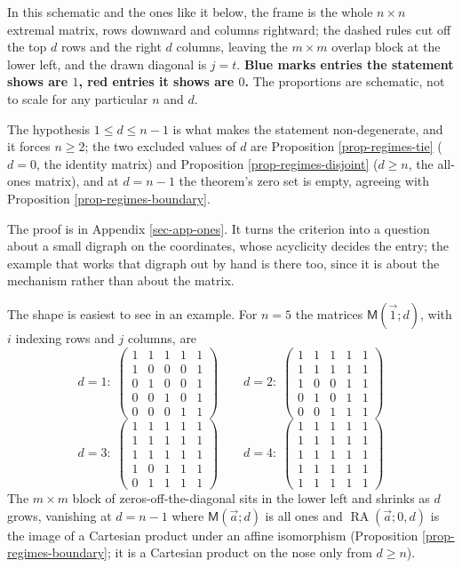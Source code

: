 \documentclass[11pt, a4paper, abstract=yes]{scrartcl}
\theoremstyle{definition}
\theoremstyle{remark}
\theoremstyle{plain}
\newcommand{\RA}{\operatorname{RA}}
\newcommand{\extten}{\mathsf{M}}
\begin{document}
In this schematic and the ones like it below, the frame is the whole \(n\times n\) extremal
matrix, rows downward and columns rightward; the dashed rules cut off the top \(d\) rows and the
right \(d\) columns, leaving the \(m\times m\) overlap block at the lower left, and the drawn
diagonal is \(j=t\). \textbf{\textbf{Blue marks entries the statement shows are \(1\), red entries it shows are
\(0\).}} The proportions are schematic, not to scale for any particular \(n\) and \(d\).

The hypothesis \(1\le d\le n-1\) is what makes the statement non-degenerate, and it forces
\(n\ge2\); the two excluded values of \(d\) are Proposition \ref{prop-regimes-tie} (\(d=0\), the
identity matrix) and Proposition \ref{prop-regimes-disjoint} (\(d\ge n\), the all-ones matrix), and at
\(d=n-1\) the theorem's zero set is empty, agreeing with Proposition \ref{prop-regimes-boundary}.

The proof is in Appendix \ref{sec-app-ones}. It turns the criterion into a question about a small
digraph on the coordinates, whose acyclicity decides the entry; the example that works that digraph
out by hand is there too, since it is about the mechanism rather than about the matrix.

The shape is easiest to see in an example. For \(n=5\) the matrices \(\extten(\vec 1;d)\), with \(i\)
indexing rows and \(j\) columns, are
\[
d=1:\;\begin{pmatrix}1&1&1&1&1\\1&0&0&0&1\\0&1&0&0&1\\0&0&1&0&1\\0&0&0&1&1\end{pmatrix} \qquad d=2:\;\begin{pmatrix}1&1&1&1&1\\1&1&1&1&1\\1&0&0&1&1\\0&1&0&1&1\\0&0&1&1&1\end{pmatrix}
\]
\[
d=3:\;\begin{pmatrix}1&1&1&1&1\\1&1&1&1&1\\1&1&1&1&1\\1&0&1&1&1\\0&1&1&1&1\end{pmatrix} \qquad d=4:\;\begin{pmatrix}1&1&1&1&1\\1&1&1&1&1\\1&1&1&1&1\\1&1&1&1&1\\1&1&1&1&1\end{pmatrix}
\]
The \(m\times m\) block of zeros-off-the-diagonal sits in the lower left and shrinks as \(d\) grows,
vanishing at \(d=n-1\) where \(\extten(\vec a;d)\) is all ones and \(\RA(\vec a;0,d)\) is the image of
a Cartesian product under an affine isomorphism (Proposition \ref{prop-regimes-boundary}; it is a
Cartesian product on the nose only from \(d\ge n\)).
\end{document}
